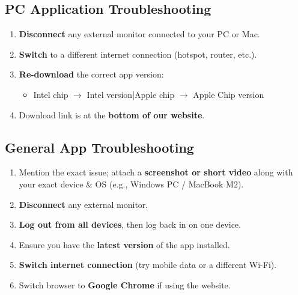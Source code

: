 \documentclass[12pt, a4paper]{article}
\begin{document}
\subsection{\faDesktop\enspace PC Application Troubleshooting}

\begin{alertbox}
  \small
  \begin{enumerate}
    \item \textbf{Disconnect} any external monitor connected to your PC or Mac.
    \item \textbf{Switch} to a different internet connection (hotspot, router, etc.).
    \item \textbf{Re-download} the correct app version:
      \begin{itemize}
        \item Intel chip $\to$ Intel version\quad|\quad Apple chip $\to$ Apple Chip version
      \end{itemize}
    \item Download link is at the \textbf{bottom of our website}.
  \end{enumerate}
\end{alertbox}

\subsection{\faBug\enspace General App Troubleshooting}

\begin{stepbox}
  \small
  \begin{enumerate}
    \item Mention the exact issue; attach a \textbf{screenshot or short video}
          along with your exact device \& OS (e.g., Windows PC / MacBook M2).
    \item \textbf{Disconnect} any external monitor.
    \item \textbf{Log out from all devices}, then log back in on one device.
    \item Ensure you have the \textbf{latest version} of the app installed.
    \item \textbf{Switch internet connection} (try mobile data or a different Wi-Fi).
    \item Switch browser to \textbf{Google Chrome} if using the website.
  \end{enumerate}
\end{stepbox}
\end{document}
